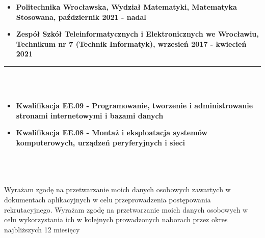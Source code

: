 \documentclass[10pt]{article}
\begin{document}
\begin{minipage}[t]{0.60\textwidth}
\begin{itemize}[leftmargin=*]
            \item \textbf{Politechnika Wrocławska, Wydział Matematyki, Matematyka Stosowana, październik 2021 - nadal}
            \item \textbf{Zespół Szkół Teleinformatycznych i Elektronicznych we Wrocławiu, Technikum nr 7 (Technik Informatyk), wrzesień 2017 - kwiecień 2021} 
        \end{itemize}
        \rule{11cm}{1pt} \\ \\
        \fontsize{10pt}{10pt}
        \begin{itemize}[leftmargin=*]
            \setlength{\parskip}{0pt}
            \item \textbf{Kwalifikacja EE.09 - Programowanie, tworzenie i administrowanie stronami
            internetowymi i bazami danych}
            \item \textbf{Kwalifikacja EE.08 - Montaż i eksploatacja systemów komputerowych, urządzeń
            peryferyjnych i sieci}
        \end{itemize}
        \rule{0pt}{0pt} \\ \\ \\ 
        \fontsize{7pt}{5pt}\selectfont  
        Wyrażam zgodę na przetwarzanie moich danych osobowych zawartych w dokumentach aplikacyjnych w
        celu przeprowadzenia postępowania rekrutacyjnego.
        Wyrażam zgodę na przetwarzanie moich danych osobowych w celu wykorzystania ich w kolejnych
        prowadzonych naborach przez okres najbliższych 12 miesięcy
    \end{minipage}
\end{document}
